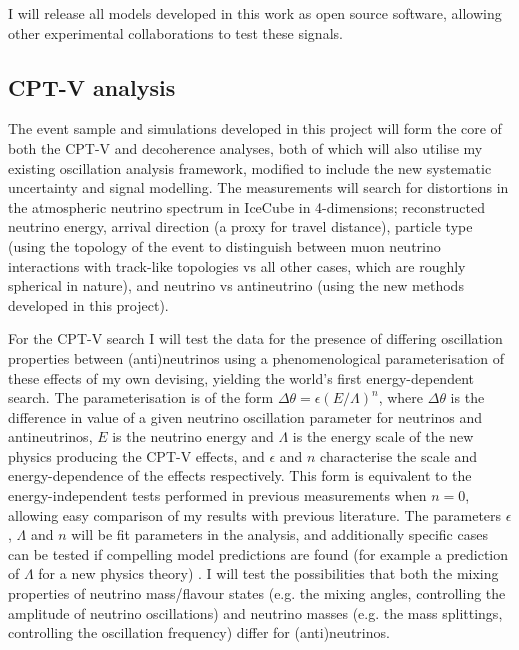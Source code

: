 \documentclass[a4paper,11pt]{article}
\begin{document}
I will release all models developed in this work as open source software, allowing other experimental collaborations to test these signals.  \\

\subsection{CPT-V analysis}

The event sample and simulations developed in this project will form the core of both the CPT-V and decoherence analyses, both of which will also utilise my existing oscillation analysis framework, modified to include the new systematic uncertainty and signal modelling. The measurements will search for distortions in the atmospheric neutrino spectrum in IceCube in 4-dimensions; reconstructed neutrino energy, arrival direction (a proxy for travel distance), particle type (using the topology of the event to distinguish between muon neutrino interactions with track-like topologies vs all other cases, which are roughly spherical in nature), and neutrino vs antineutrino (using the new methods developed in this project).

For the CPT-V search I will test the data for the presence of differing oscillation properties between (anti)neutrinos using a phenomenological parameterisation of these effects of my own devising, yielding the world's first energy-dependent search. The parameterisation is of the form $\Delta \theta = \epsilon (E/\Lambda)^n$, where $\Delta \theta$ is the difference in value of a given neutrino oscillation parameter for neutrinos and antineutrinos, $E$ is the neutrino energy and $\Lambda$ is the energy scale of the new physics producing the CPT-V effects, and $\epsilon$ and $n$ characterise the scale and energy-dependence of the effects respectively. This form is equivalent to the energy-independent tests performed in previous measurements when $n=0$, allowing easy comparison of my results with previous literature. The parameters $\epsilon$, $\Lambda$ and $n$ will be fit parameters in the analysis, and additionally specific cases can be tested if compelling model predictions are found (for example a prediction of $\Lambda$ for a new physics theory) . I will test the possibilities that both the mixing properties of neutrino mass/flavour states (e.g. the mixing angles, controlling the amplitude of neutrino oscillations) and neutrino masses (e.g. the mass splittings, controlling the oscillation frequency) differ for (anti)neutrinos. 
\end{document}
